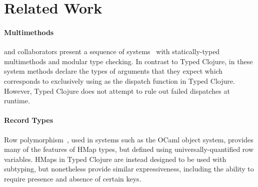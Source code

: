 \section{Related Work}

\paragraph{Multimethods} 
\citeauthor{MS02} and collaborators present a sequence of
systems~\cite{MS02, cecil, more} with statically-typed multimethods
and modular type checking.  In contrast to Typed Clojure, in these
system methods declare the types of arguments that they expect which
corresponds to exclusively using  as the dispatch function
in Typed Clojure. However, Typed Clojure does not attempt to rule out
failed dispatches at runtime.







\paragraph{Record Types} Row polymorphism~\cite{Wan89,CM91,HP91}, used
in systems such as the OCaml object system, provides many of the
features of HMap types, but defined using universally-quantified row
variables. HMaps in Typed Clojure are instead designed to be used with
subtyping, but nonetheless provide similar expressiveness, including
the ability to require presence and absence of certain keys. 

